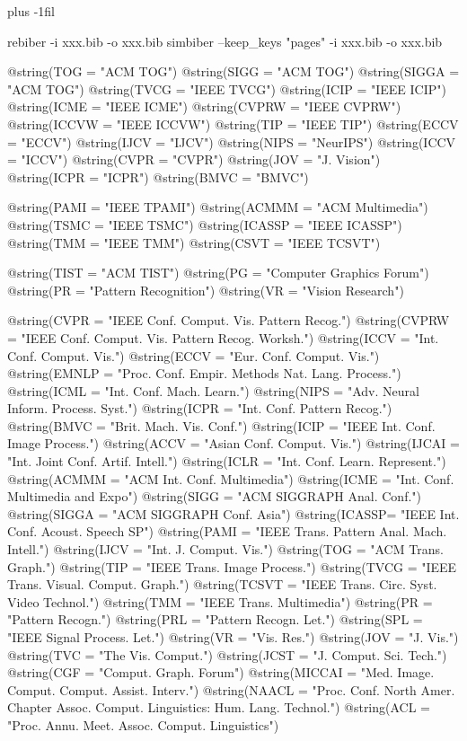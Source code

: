 

\baselineskip plus -1fil

rebiber -i xxx.bib -o xxx.bib
simbiber --keep_keys "pages" -i xxx.bib -o xxx.bib

@string(TOG = "{ACM TOG}")
@string(SIGG = "{ACM TOG}")
@string(SIGGA = "{ACM TOG}")
@string(TVCG = "{IEEE TVCG}")
@string(ICIP = "{IEEE ICIP}")
@string(ICME = "{IEEE ICME}")
@string(CVPRW = "{IEEE CVPRW}")
@string(ICCVW = "{IEEE ICCVW}")
@string(TIP = "{IEEE TIP}")
@string(ECCV = "{ECCV}")
@string(IJCV = "{IJCV}")
@string(NIPS = "{NeurIPS}")
@string(ICCV = "{ICCV}")
@string(CVPR = "{CVPR}")
@string(JOV = "{J. Vision}")
@string(ICPR = "{ICPR}")
@string(BMVC =	"{BMVC}")

@string(PAMI = "{IEEE TPAMI}")
@string(ACMMM	= "{ACM Multimedia}")
@string(TSMC = "{IEEE TSMC}")
@string(ICASSP = "{IEEE ICASSP}")
@string(TMM	= "{IEEE TMM}")
@string(CSVT = "{IEEE TCSVT}")

@string(TIST = "{ACM TIST}")
@string(PG = "{Computer Graphics Forum}")
@string(PR = "{Pattern Recognition}")
@string(VR = "{Vision Research}")

@string(CVPR  = "{IEEE Conf. Comput. Vis. Pattern Recog.}")
@string(CVPRW = "{IEEE Conf. Comput. Vis. Pattern Recog. Worksh.}")
@string(ICCV  = "{Int. Conf. Comput. Vis.}")
@string(ECCV  = "{Eur. Conf. Comput. Vis.}")
@string(EMNLP  = "{Proc. Conf. Empir. Methods Nat. Lang. Process.}")
@string(ICML  = "{Int. Conf. Mach. Learn.}")
@string(NIPS  = "{Adv. Neural Inform. Process. Syst.}")
@string(ICPR  = "{Int. Conf. Pattern Recog.}")
@string(BMVC  = "{Brit. Mach. Vis. Conf.}")
@string(ICIP  = "{IEEE Int. Conf. Image Process.}")
@string(ACCV  = "{Asian Conf. Comput. Vis.}")
@string(IJCAI = "{Int. Joint Conf. Artif. Intell.}")
@string(ICLR  = "{Int. Conf. Learn. Represent.}")
@string(ACMMM = "{ACM Int. Conf. Multimedia}")
@string(ICME  = "{Int. Conf. Multimedia and Expo}")
@string(SIGG  = "{ACM SIGGRAPH Anal. Conf.}")
@string(SIGGA = "{ACM SIGGRAPH Conf. Asia}")
@string(ICASSP=	"{IEEE Int. Conf. Acoust. Speech SP}")
@string(PAMI  = "{IEEE Trans. Pattern Anal. Mach. Intell.}")
@string(IJCV  = "{Int. J. Comput. Vis.}")
@string(TOG   = "{ACM Trans. Graph.}")
@string(TIP   = "{IEEE Trans. Image Process.}")
@string(TVCG  = "{IEEE Trans. Visual. Comput. Graph.}")
@string(TCSVT = "{IEEE Trans. Circ. Syst. Video Technol.}")
@string(TMM   = "{IEEE Trans. Multimedia}")
@string(PR    = "{Pattern Recogn.}")
@string(PRL    = "{Pattern Recogn. Let.}")
@string(SPL	  = "{IEEE Signal Process. Let.}")
@string(VR    = "{Vis. Res.}")
@string(JOV	  = "{J. Vis.}")
@string(TVC   = "{The Vis. Comput.}")
@string(JCST  = "{J. Comput. Sci. Tech.}")
@string(CGF   = "{Comput. Graph. Forum}")
@string(MICCAI   = "{Med. Image. Comput. Comput. Assist. Interv.}")
@string(NAACL = "{Proc. Conf. North Amer. Chapter Assoc. Comput. Linguistics: Hum. Lang. Technol.}")
@string(ACL   = "{Proc. Annu. Meet. Assoc. Comput. Linguistics}")
